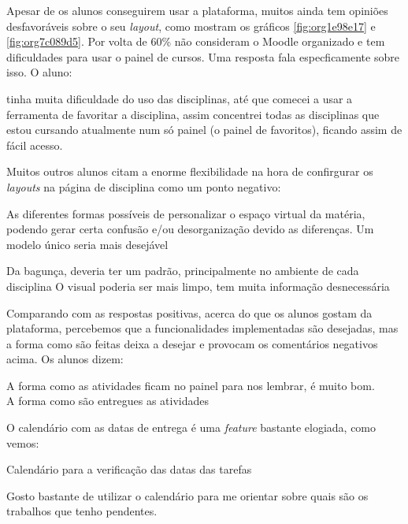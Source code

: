\documentclass[11pt]{article}
\renewenvironment{quote}{\small\list{}{\rightmargin=0cm \leftmargin=4cm}\item[]\relax}{\endlist}
\begin{document}
Apesar de os alunos conseguirem usar a plataforma, muitos ainda tem
opiniões desfavoráveis sobre o seu \emph{layout}, como mostram os gráficos
\ref{fig:org1e98e17} e \ref{fig:org7c089d5}. Por volta de 60\% não consideram o Moodle
organizado e tem dificuldades para usar o painel de cursos. Uma
resposta fala especficamente sobre isso. O aluno:

\begin{quote}
[\ldots{}] tinha muita dificuldade do uso das disciplinas, até
que comecei a usar a ferramenta de favoritar a disciplina, assim
concentrei todas as disciplinas que estou cursando atualmente num só
painel (o painel de favoritos), ficando assim de fácil acesso.
\end{quote}

Muitos outros alunos citam a enorme flexibilidade na hora de
confirgurar os \emph{layouts} na página de disciplina como um ponto
negativo:

\begin{quote}
As diferentes formas possíveis de personalizar o espaço virtual da
matéria, podendo gerar certa confusão e/ou desorganização devido as
diferenças. Um modelo único seria mais desejável
\end{quote}


\begin{quote}
Da bagunça, deveria ter um padrão, principalmente no ambiente de cada
disciplina O visual poderia ser mais limpo, tem muita informação
desnecessária
\end{quote}

Comparando com as respostas positivas, acerca do que os alunos gostam
da plataforma, percebemos que a funcionalidades implementadas são
desejadas, mas a forma como são feitas deixa a desejar e provocam os
comentários negativos acima.
Os alunos dizem:

\begin{quote}
A forma como as atividades ficam no painel para nos lembrar, é muito
  bom.\\
A forma como são entregues as atividades
\end{quote}

O calendário com as datas de entrega é uma \emph{feature} bastante
elogiada, como vemos:

\begin{quote}
Calendário para a verificação das datas das tarefas
\end{quote}

\begin{quote}
Gosto bastante de utilizar o calendário para me orientar sobre quais
são os trabalhos que tenho pendentes.
\end{quote}
\end{document}

